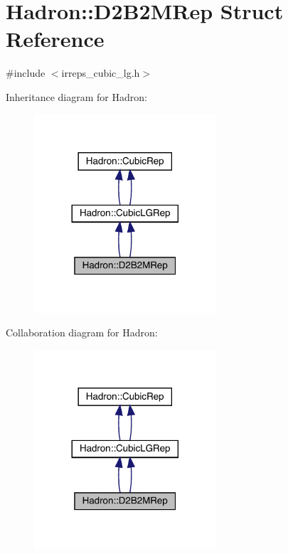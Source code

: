 \hypertarget{structHadron_1_1D2B2MRep}{}\section{Hadron\+:\+:D2\+B2\+M\+Rep Struct Reference}
\label{structHadron_1_1D2B2MRep}


{\ttfamily \#include $<$irreps\+\_\+cubic\+\_\+lg.\+h$>$}



Inheritance diagram for Hadron\+:\nopagebreak
\begin{figure}[H]
\begin{center}
\leavevmode
\includegraphics[width=192pt]{dc/dff/structHadron_1_1D2B2MRep__inherit__graph}
\end{center}
\end{figure}


Collaboration diagram for Hadron\+:\nopagebreak
\begin{figure}[H]
\begin{center}
\leavevmode
\includegraphics[width=192pt]{de/d6e/structHadron_1_1D2B2MRep__coll__graph}
\end{center}
\end{figure}
